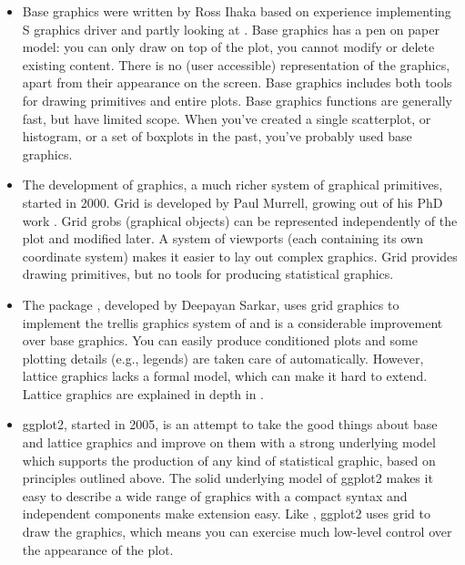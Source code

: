 \begin{itemize} 
  \item Base graphics were written by Ross Ihaka based on experience implementing S graphics driver and partly looking at \cite{chambers:1983}.  Base graphics has a pen on paper model: you can only draw on top of the plot, you cannot modify or delete existing content.  There is no (user accessible) representation of the graphics, apart from their appearance on the screen. Base graphics includes both tools for drawing primitives and entire plots.  Base graphics functions are generally fast, but have limited scope. When you've created a single scatterplot, or histogram, or a set of boxplots in the past, you've probably used base graphics. 

  \item The development of  graphics, a much richer system of graphical primitives, started in 2000.  Grid is developed by Paul Murrell, growing out of his PhD work \citep{murrell:1998}. Grid grobs (graphical objects) can be represented independently of the plot and modified later. A system of viewports (each containing its own coordinate system) makes it easier to lay out complex graphics. Grid provides drawing primitives, but no tools for producing statistical graphics. 

  \item The  package \citep{lattice}, developed by Deepayan Sarkar, uses grid graphics to implement the trellis graphics system of \citet{cleveland:1993,cleveland:1994} and is a considerable improvement over base graphics.  You can easily produce conditioned plots and some plotting details (e.g., legends) are taken care of automatically.  However, lattice graphics lacks a formal model, which can make it hard to extend.  Lattice graphics are explained in depth in \citep{sarkar:2008}. 

  \item ggplot2, started in 2005, is an attempt to take the good things about base and lattice graphics and improve on them with a strong underlying model which supports the production of any kind of statistical graphic, based on principles outlined above.  The solid underlying model of ggplot2 makes it easy to describe a wide range of graphics with a compact syntax and independent components make extension easy.  Like , ggplot2 uses grid to draw the graphics, which means you can exercise much low-level control over the appearance of the plot.

\end{itemize}

